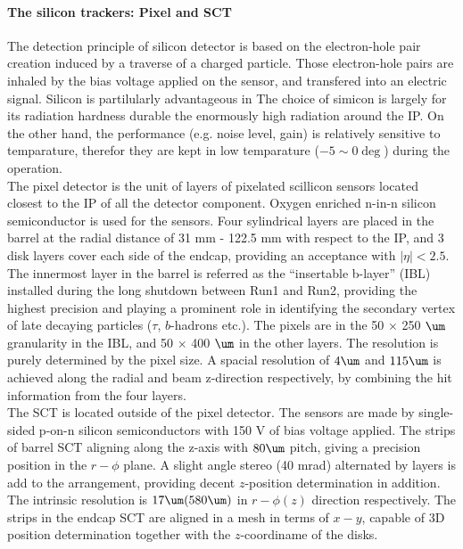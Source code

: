 \paragraph{The silicon trackers: Pixel and SCT} 
The detection principle of silicon detector is based on the electron-hole pair creation induced by a traverse of a charged particle.
Those electron-hole pairs are inhaled by the bias voltage applied on the sensor, and transfered into an electric signal. 
Silicon is partilularly advantageous in 
The choice of simicon is largely for its radiation hardness durable the enormously high radiation around the IP. 
On the other hand, the performance (e.g. noise level, gain) is relatively sensitive to temparature, therefor they are kept in low temparature ($-5 \sim 0\deg$) during the operation.  \\

The pixel detector is the unit of layers of pixelated scillicon sensors located closest to the IP of all the detector component. 
Oxygen enriched n-in-n silicon semiconductor is used for the sensors.
Four sylindrical layers are placed in the barrel at the radial distance of 31 mm - 122.5 mm with respect to the IP, 
and 3 disk layers cover each side of the endcap, providing an acceptance with $|\eta|<2.5$. 
The innermost layer in the barrel is referred as the ``insertable b-layer'' (IBL) installed during the long shutdown between Run1 and Run2, providing the highest precision and playing a prominent role in identifying the secondary vertex of late decaying particles ($\tau$, $b$-hadrons etc.). 
The pixels are in the 50 $\times$ 250 $\um$ granularity in the IBL, and 50 $\times$ 400 $\um$ in the other layers. 
The resolution is purely determined by the pixel size. A spacial resolution of $4\um$ and $115\um$ is achieved along the radial and beam z-direction respectively, 
by combining the hit information from the four layers. \\

The SCT is located outside of the pixel detector. The sensors are made by single-sided p-on-n silicon semiconductors with 150 V of bias voltage applied. %
The strips of barrel SCT aligning along the z-axis with $80\um$ pitch, giving a precision position in the $r-\phi$ plane. 
A slight angle stereo (40 mrad) alternated by layers is add to the arrangement, providing decent $z$-position determination in addition. 
The intrinsic resolution is $17\um (580\um)$ in $r-\phi (z)$ direction respectively.
The strips in the endcap SCT are aligned in a mesh in terms of $x-y$, capable of 3D position determination together with the $z$-coordiname of the disks.

